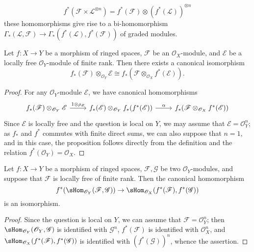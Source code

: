 \[f^*(\mathscr{F}\times\mathscr{L}^{\otimes n})=f^*(\mathscr{F})\otimes(f^*(\mathscr{L}))^{\otimes n}\]
these homomorphisms give rise to a bi-homomorphism $\Gamma_*(\mathscr{L},\mathscr{F})\to\Gamma_*(f^*(\mathscr{L}),f^*(\mathscr{F}))$ of graded modules.
\begin{proposition}\label{sheaf of module local free projection formula}
Let $f:X\to Y$ be a morphism of ringed spaces, $\mathscr{F}$ be an $\mathscr{O}_X$-module, and $\mathscr{E}$ be a locally free $\mathscr{O}_Y$-module of finite rank. Then there exists a canonical isomorphism
\[f_*(\mathscr{F})\otimes_{\mathscr{O}_Y}\mathscr{E}\cong f_*(\mathscr{F}\otimes_{\mathscr{O}_X}f^*(\mathscr{E})).\]
\end{proposition}
\begin{proof}
For any $\mathscr{O}_Y$-module $\mathscr{E}$, we have canonical homomorphisms
\[\begin{tikzcd}
f_*(\mathscr{F})\otimes_{\mathscr{O}_Y}\mathscr{E}\ar[r,"1\otimes\rho_{\mathscr{E}}"]&f_*(\mathscr{E})\otimes_{\mathscr{O}_Y}f_*(f^*(\mathscr{E}))\ar[r,"\alpha"]&f_*(\mathscr{F}\otimes_{\mathscr{O}_X}f^*(\mathscr{E}))
\end{tikzcd}\]
Since $\mathscr{E}$ is locally free and the question is local on $Y$, we may assume that $\mathscr{E}=\mathscr{O}_Y^n$; as $f_*$ and $f^*$ commutes with finite direct sums, we can also suppose that $n=1$, and in this case, the proposition follows directly from the definition and the relation $f^*(\mathscr{O}_Y)=\mathscr{O}_X$.
\end{proof}
\begin{proposition}\label{sheaf of module local free inverse image of Hom}
Let $f:X\to Y$ be a morphism of ringed spaces, $\mathscr{F},\mathscr{G}$ be two $\mathscr{O}_Y$-modules, and suppose that $\mathscr{F}$ is locally free of finite rank. Then the canonical homomorphism
\[f^*(\sHom_{\mathscr{O}_Y}(\mathscr{F},\mathscr{G}))\to\sHom_{\mathscr{O}_X}(f^*(\mathscr{F}),f^*(\mathscr{G}))\]
is an isomorphism.
\end{proposition}
\begin{proof}
Since the question is local on $Y$, we can assume that $\mathscr{F}=\mathscr{O}_Y^n$; then $\sHom_{\mathscr{O}_Y}(\mathscr{O}_Y,\mathscr{G})$ is identified with $\mathscr{G}^n$, $f^*(\mathscr{F})$ is identified with $\mathscr{O}_X^n$, and $\sHom_{\mathscr{O}_X}(f^*(\mathscr{F}),f^*(\mathscr{G}))$ is identified with $(f^*(\mathscr{G}))^n$, whence the assertion.
\end{proof}
